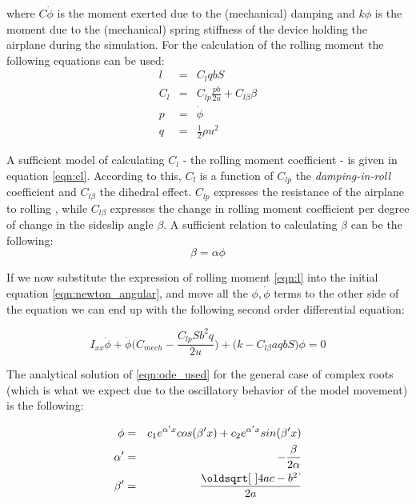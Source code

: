 \noindent where $C\dot{\phi}$ is the moment exerted due to the (mechanical) damping and $k\phi$ is
the moment due to the (mechanical) spring stiffness of the device holding the airplane during the simulation.
For the calculation of the rolling moment the following equations can be used:
\begin{eqnarray}
    l &=& C_l q b S \label{eqn:roll_moment} \label{eqn:l}\\
    C_l &=&  C_{lp}\frac{pb}{2u} + C_{l\beta}\beta \label{eqn:cl}\\
    p &=&\dot{\phi} \\
    q &=&  \frac{1}{2}\rho u^2 
\end{eqnarray}

%
%

A sufficient model of calculating $C_l$ - the rolling moment coefficient - is given in equation
\ref{eqn:cl}. According to this, $C_l$ is a function of $C_{lp}$ the \textit{damping-in-roll}
coefficient and $C_{l\beta}$ the dihedral effect.
$C_{lp}$ expresses the resistance of the airplane to rolling 
\cite{etkin_dynamics_1972}, while $C_{l\beta}$ expresses the change in rolling moment 
coefficient per degree of change in the sideslip angle $\beta$. A sufficient relation to 
calculating $\beta$ can be the following:
\begin{equation}
    \beta = \alpha \phi
    \label{eqn:beta}
\end{equation}

%

\noindent If we now substitute the expression of rolling moment \ref{eqn:l} into the initial equation
\ref{eqn:newton_angular}, and move all the $\phi, \dot{\phi}$ terms to the other side of the equation
we can end up with the following second order differential equation:

\begin{equation}
    I_{xx}\ddot{\phi} + \dot{\phi}\big(C_{mech} - \frac{C_{lp}Sb^2q}{2u}\big) + \big(k - C_{l\beta}aqbS\big)\phi = 0
    \label{eqn:ode_used}
\end{equation}

\noindent The analytical solution of \ref{eqn:ode_used} for the general case of complex roots
(which is what we expect due to the oscillatory behavior of the model movement) is the following:

\begin{eqnarray}
    \phi &=&  c_1e^{\alpha' x}cos(\beta' x) + c_2e^{\alpha' x} sin(\beta' x) \label{eqn:phianal}\\
    \alpha' &=&  -\frac{\beta}{2\alpha} \notag\\
    \beta' &=&  \frac{\sqrt{4ac - b^2}}{2a} \notag\\
\end{eqnarray}

